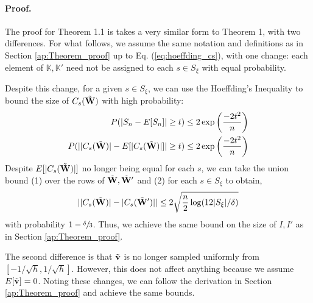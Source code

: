 \paragraph{Proof.} 
The proof for Theorem 1.1 is takes a very similar form to Theorem 1, with two differences. For what follows, we assume the same notation and definitions as in Section \ref{ap:Theorem_proof} up to Eq. (\ref{eq:hoeffding_cs}), with one change: each element of $\mathbb{K},\mathbb{K}'$ need not be assigned to each $s\in S_\xi$ with equal probability. 

Despite this change, for a given $s\in S_\xi$, we can use the Hoeffding's Inequality to bound the size of $C_s(\Tilde{{\mathbf{W}}})$ with high probability:
\begin{align}
    P(|S_n - E[S_n]| \geq t) \leq 2\exp\left(\frac{-2t^2}{n}\right) \\
    P(||C_s(\Tilde{{\mathbf{W}}})| - E[|C_s(\Tilde{{\mathbf{W}}})|]| \geq t) \leq 2\exp\left(\frac{-2t^2}{n}\right) \\
\end{align}
Despite $E[|C_s(\Tilde{{\mathbf{W}}})|]$ no longer being equal for each $s$, we can take the union bound (1) over the rows of $\Tilde{{\mathbf{W}}}, \Tilde{{\mathbf{W}}}'$ and (2) for each $s\in S_\xi$ to obtain,
\begin{equation}
    ||C_s(\Tilde{{\mathbf{W}}})| - |C_s(\Tilde{{\mathbf{W}}}')|| \leq 2\sqrt{\frac{n}{2}\log(12|S_\xi|/\delta)}
\end{equation}
with probability $1-\sfrac{\delta}{3}$. Thus, we achieve the same bound on the size of $I,I'$ as in Section \ref{ap:Theorem_proof}. 

The second difference is that $\Tilde{{\mathbf{v}}}$ is no longer sampled uniformly from $[-1/\sqrt{h}, 1/\sqrt{h}]$. However, this does not affect anything because we assume $E[\Tilde{{\mathbf{v}}}]=0$.
Noting these changes, we can follow the derivation in Section \ref{ap:Theorem_proof} and achieve the same bounds.


